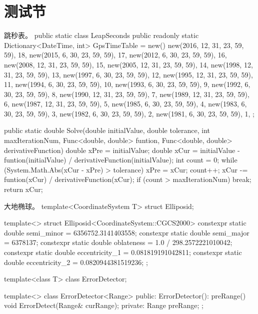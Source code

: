 \documentclass[codepkg=minted,titlestyle=lralign]{course-report}
\begin{document}
\section{测试节}

\begin{codebox}[
  minted language=csharp
]{跳秒表。}
public static class LeapSeconds
{
    public readonly static Dictionary<DateTime, int> GpsTimeTable = new() 
    {
        {new(2016, 12, 31, 23, 59, 59), 18},
        {new(2015, 6, 30, 23, 59, 59), 17},   
        {new(2012, 6, 30, 23, 59, 59), 16},    
        {new(2008, 12, 31, 23, 59, 59), 15},    
        {new(2005, 12, 31, 23, 59, 59), 14},    
        {new(1998, 12, 31, 23, 59, 59), 13},    
        {new(1997, 6, 30, 23, 59, 59), 12},    
        {new(1995, 12, 31, 23, 59, 59), 11},    
        {new(1994, 6, 30, 23, 59, 59), 10},    
        {new(1993, 6, 30, 23, 59, 59), 9},    
        {new(1992, 6, 30, 23, 59, 59), 8},    
        {new(1990, 12, 31, 23, 59, 59), 7},    
        {new(1989, 12, 31, 23, 59, 59), 6},    
        {new(1987, 12, 31, 23, 59, 59), 5},    
        {new(1985, 6, 30, 23, 59, 59), 4},    
        {new(1983, 6, 30, 23, 59, 59), 3},    
        {new(1982, 6, 30, 23, 59, 59), 2},    
        {new(1981, 6, 30, 23, 59, 59), 1},   
    };
}
\end{codebox}

\begin{codebox}
public static double Solve(double initialValue, double tolerance, int maxIterationNum, Func<double, double> funtion, Func<double, double> derivativeFunction)
{
    double xPre = initialValue;
    double xCur = initialValue - funtion(initialValue) / derivativeFunction(initialValue);
    int count = 0;
    while (System.Math.Abs(xCur - xPre) > tolerance)
    {
        xPre = xCur;
        count++;
        xCur -= funtion(xCur) / derivativeFunction(xCur);
        if (count > maxIterationNum)
            break;
    }
    return xCur;
}
\end{codebox}

\begin{codebox*}{
  大地椭球。
}
template<CoordinateSystem T>
struct Elliposid;

template<>
struct Elliposid<CoordinateSystem::CGCS2000>
{
    constexpr static double semi_minor     = 6356752.3141403558;
    constexpr static double semi_major     = 6378137;
    constexpr static double oblateness     = 1.0 / 298.2572221010042;
    constexpr static double eccentricity_1 = 0.081819191042811;
    constexpr static double eccentricity_2 = 0.0820944381519236;
};
\end{codebox*}

\begin{codebox*}
template<class T>
class ErrorDetector;

template<>
class ErrorDetector<Range>
{
public:
    ErrorDetector(): preRange() { }
    void ErrorDetect(Range& curRange);
private:
    Range preRange;
};
\end{codebox*}

\backmatter

\nocite{*}

\makebibliography
\end{document}
